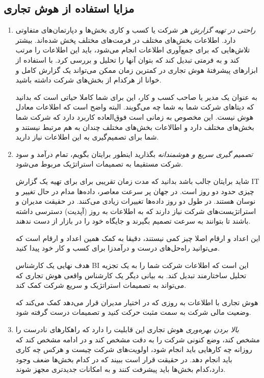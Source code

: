 \documentclass{llncs}
\begin{document}
\subsection{مزایا استفاده از هوش تجاری}
\begin{enumerate}
  \item \textit{راحتی در تهیه گزارش}
  \newline
هر شرکت یا کسب و کاری بخش‌ها و دپارتمان‌های متفاوتی دارد. اطلاعات بخش‌های مختلف در فرمت‌های مختلف پخش شده‌اند. بیشتر تلاش‌هایی که برای جمع‌آوری اطلاعات انجام می‌شود، باید این اطلاعات را مرتب کند و به فرمتی تبدیل کند که بتوان آنها را تحلیل و بررسی کرد. با استفاده از ابزارهای پیشرفتۀ هوش تجاری در کمترین زمان ممکن می‌تواند یک گزارش کامل و خوانا از هرکدام از بخش‌های شرکت داشته باشید.

به عنوان یک مدیر یا صاحب کسب و کار، این برای شما کاملا حیاتی است که بدانید که دیتاهای شرکت شما به شما چه می‌گویند. البته واضح است که اطلاعات معادل هوش نیست. این مخصوص به زمانی است فوق‌العاده کاربرد دارد که شرکت شما بخش‌های مختلف دارد و اطالاعات بخش‌های مختلف چندان به هم مرتبط نیستند و شما برای تصمیم‌گیری به این اطلاعات نیاز دارید.

  \item \textit{تصمیم گیری سریع و هوشمندانه}
  \newline
بگذارید اینطور برایتان بگویم، تمام درآمد و سود شرکت مستقیما به تصمیمات استراتژیک مربوط می‌شود.

شاید برایتان جالب باشد بدانید که مدت زمان تقریبی برای برای تهیه یک گزارش IT چیزی حدود دو روز است. در جهان پر سرعت معاصر، داده‌ها مدام در حال تغییر و نوسان هستند. در طول دو روز داده‌ها تغییرات زیادی می‌کنند. در حقیقت مدیران و استراتژیست‌های شرکت نیاز دارند که به اطلاعات به روز (آپدیت) دسترسی داشته باشند تا بتوانند به سرعت تصمیم بگیرند و جایگاه خود را در بازار از دست ندهند.

این اعداد و ارقام اصلا چیز کمی نیستند، دقیقا به کمک همین اعداد و ارقام است که می‌توانید راه‌حل‌های درست و درآمدزا برای کسب و کار خود پیدا کنید.

هدف نهایی یک کارشناس BI این است که اطلاعات شرکت شما را به یک تجزیه تحلیل ساختارمند تبدیل کند. به بیانی دیگر یک کارشناس واقعی هوش تجاری که می‌تواند به تصمیمات استراتژیک و سریع شرکت کمک کند.

هوش تجاری با اطلاعات به روزی که در اختیار مدیران قرار می‌دهد کمک می‌کند که وضعیت مالی شرکت به سمت مثبت حرکت کنید و تصمیمات درست گرفته شود.

  \item \textit{بالا بردن بهره‌وری}
  \newline
هوش تجاری این قابلیت را دارد که راهکارهای نادرست را مشخص کند، وضع کنونی شرکت را به دقت مشخص کند و در ادامه مشخص کند که روزانه چه کارهایی باید انجام شود، اولویت‌های شرکت چیست و هرکس چه کاری باید انجام دهد. در حقیقت قرار است ببیند که در کدام بخش‌ها ضعف وجود دارد،کدام بخش‌ها باید پیشرفت کنند و به امکانات جدیدتری مجهز شوند.


\end{enumerate}
\end{document}
